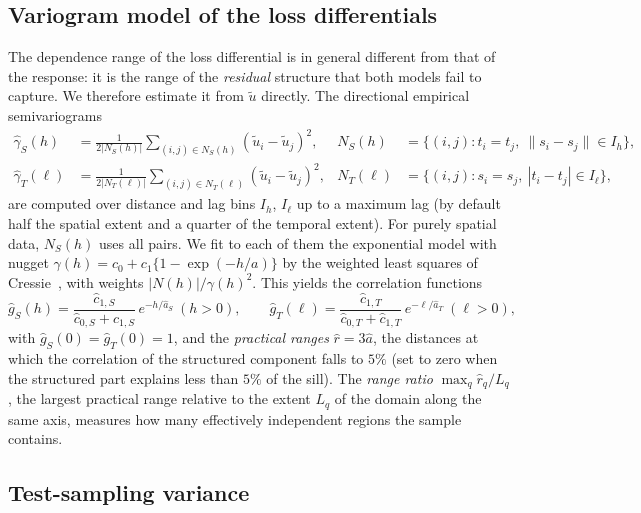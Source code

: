 \subsection{Variogram model of the loss differentials}

The dependence range of the loss differential is in general different from that of the response: it is the range of the \emph{residual} structure that both models fail to capture. We therefore estimate it from $\tilde u$ directly. The directional empirical semivariograms
\begin{align*}
\hat\gamma_S(h)&=\frac{1}{2|N_S(h)|}\sum_{(i,j)\in N_S(h)}(\tilde u_i-\tilde u_j)^2,& N_S(h)&=\{(i,j):t_i=t_j,\ \|s_i-s_j\|\in I_h\},\\
\hat\gamma_T(\ell)&=\frac{1}{2|N_T(\ell)|}\sum_{(i,j)\in N_T(\ell)}(\tilde u_i-\tilde u_j)^2,& N_T(\ell)&=\{(i,j):s_i=s_j,\ |t_i-t_j|\in I_\ell\},
\end{align*}
are computed over distance and lag bins $I_h$, $I_\ell$ up to a maximum lag (by default half the spatial extent and a quarter of the temporal extent). For purely spatial data, $N_S(h)$ uses all pairs. We fit to each of them the exponential model with nugget $\gamma(h)=c_0+c_1\{1-\exp(-h/a)\}$ by the weighted least squares of Cressie~\cite{cressie1985}, with weights $|N(h)|/\gamma(h)^2$. This yields the correlation functions
\begin{equation}\label{eq:corr}
\hat g_S(h)=\frac{\hat c_{1,S}}{\hat c_{0,S}+\hat c_{1,S}}\,e^{-h/\hat a_S}\ (h>0),\qquad
\hat g_T(\ell)=\frac{\hat c_{1,T}}{\hat c_{0,T}+\hat c_{1,T}}\,e^{-\ell/\hat a_T}\ (\ell>0),
\end{equation}
with $\hat g_S(0)=\hat g_T(0)=1$, and the \emph{practical ranges} $\hat r=3\hat a$, the distances at which the correlation of the structured component falls to $5\%$ (set to zero when the structured part explains less than $5\%$ of the sill). The \emph{range ratio} $\max_q\hat r_q/L_q$, the largest practical range relative to the extent $L_q$ of the domain along the same axis, measures how many effectively independent regions the sample contains.

\subsection{Test-sampling variance}

